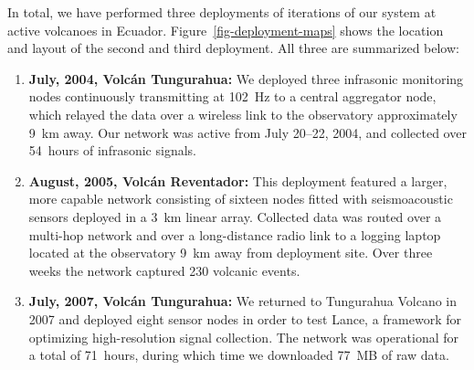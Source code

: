 In total, we have performed three deployments of iterations of our system at
active volcanoes in Ecuador. Figure~\ref{fig-deployment-maps} shows the
location and layout of the second and third deployment. All three are
summarized below:
\begin{enumerate}
\item \textbf{July, 2004, Volc\'{a}n Tungurahua:} We deployed three infrasonic
monitoring nodes continuously transmitting at 102~Hz to a central aggregator
node, which relayed the data over a wireless link to the observatory
approximately 9~km away.  Our network was active from July 20--22, 2004, and
collected over 54~hours of infrasonic signals.
\item \textbf{August, 2005, Volc\'{a}n Reventador:} This deployment featured a
larger, more capable network consisting of sixteen nodes fitted with
seismoacoustic sensors deployed in a 3~km linear array.  Collected data was
routed over a multi-hop network and over a long-distance radio link to a
logging laptop located at the observatory 9~km away from deployment site.
Over three weeks the network captured 230 volcanic events.
\item \textbf{July, 2007, Volc\'{a}n Tungurahua:} We returned to Tungurahua
Volcano in 2007 and deployed eight sensor nodes in order to test Lance, a
framework for optimizing high-resolution signal collection. The network was operational for a total
of 71~hours, during which time we downloaded 77~MB of raw data.
\end{enumerate}

